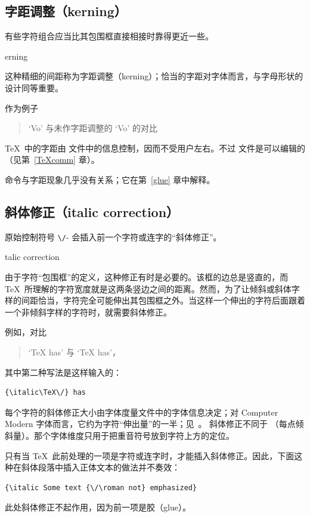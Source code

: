 \documentclass[a4paper]{rapport3}
\makeatletter
\newenvironment{Disp}{\begin{quotation}}{\end{quotation}}
\def\term#1\par{\index{#1}}
\def\cstoidx#1\par{\index{#1@\cs{#1}}}
\makeatother
\begin{document}
\subsection{字距调整（kerning）}

有些字符组合应当比其包围框直接相接时靠得更近一些。
\term kerning\par
这种精细的间距称为字距调整（kerning）；恰当的字距对字体而言，与字母形状的设计同等重要。

作为例子
\begin{Disp} `Vo' 与未作字距调整的 `V\hbox{}o' 的对比\end{Disp}

\TeX\ 中的字距由  文件中的信息控制，因而不受用户左右。不过  文件是可以编辑的（见第~\ref{TeXcomm} 章）。

 命令与字距现象几乎没有关系；它在第~\ref{glue} 章中解释。

\subsection{斜体修正（italic correction）}

原始控制符号 \verb-\/-- 会插入前一个字符或连字的“斜体修正”。
\term italic correction\par\cstoidx /\par
由于字符“包围框”的定义，这种修正有时是必要的。该框的边总是竖直的，而 \TeX\ 所理解的字符宽度就是这两条竖边之间的距离。然而，为了让倾斜或斜体字样的间距恰当，字符完全可能伸出其包围框之外。当这样一个伸出的字符后面跟着一个非倾斜字样的字符时，就需要斜体修正。
\awp

例如，对比
\begin{Disp} `{\italic\TeX} has'
与 `{\italic\TeX\/} has'，
\end{Disp} 其中第二种写法是这样输入的：
\begin{verbatim}
{\italic\TeX\/} has
\end{verbatim}

每个字符的斜体修正大小由字体度量文件中的字体信息决定；对 Computer Modern 字体而言，它约为字符“伸出量”的一半；见~\cite{K:partE}。
斜体修正不同于 （每点倾斜量）。那个字体维度只用于把重音符号放到字符上方的定位。

只有当 \TeX\ 此前处理的一项是字符或连字时，才能插入斜体修正。因此，下面这种在斜体段落中插入正体文本的做法并不奏效：
\begin{verbatim}
{\italic Some text {\/\roman not} emphasized}
\end{verbatim}
此处斜体修正不起作用，因为前一项是胶（glue）。
\end{document}
